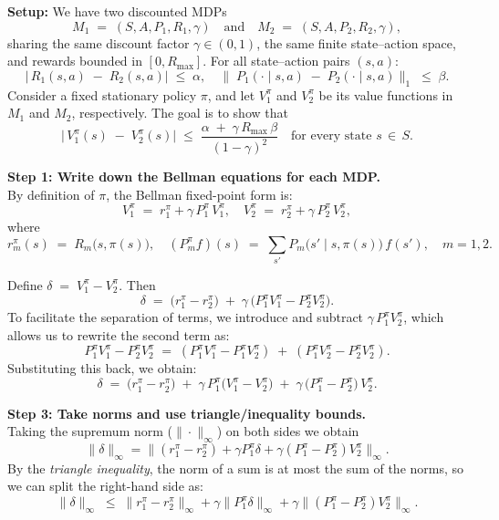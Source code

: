 \textbf{Setup:} We have two discounted MDPs 
\[
  M_1 \;=\; (S, A, P_1, R_1, \gamma)
  \quad\text{and}\quad
  M_2 \;=\; (S, A, P_2, R_2, \gamma),
\]
sharing the same discount factor $\gamma \in (0,1)$, the same finite state--action space, and rewards bounded in $[0,R_{\max}]$.  
For all state--action pairs $(s,a)$:
\[
  \bigl|\,R_1(s,a) \;-\; R_2(s,a)\bigr|\;\le\;\alpha,
  \quad
  \bigl\|\;P_1(\cdot \mid s,a)\;-\;P_2(\cdot \mid s,a)\bigr\|_{1}\;\le\;\beta.
\]
Consider a fixed stationary policy $\pi$, and let $V_{1}^{\pi}$ and $V_{2}^{\pi}$ be its value functions in $M_1$ and $M_2$, respectively. The goal is to show that
\[
  \bigl|\,V_{1}^{\pi}(s)\;-\;V_{2}^{\pi}(s)\bigr|
  \;\le\;
  \frac{\alpha \;+\;\gamma\,R_{\max}\,\beta}{(1-\gamma)^{2}}
  \quad
  \text{for every state }s\,\in\,S.
\]

\bigskip
\noindent
\textbf{Step 1: Write down the Bellman equations for each MDP.}\\
By definition of $\pi$, the Bellman fixed-point form is:
\[
  V_{1}^{\pi} \;=\; r_{1}^{\pi} + \gamma\,P_{1}^{\pi}\,V_{1}^{\pi},
  \quad
  V_{2}^{\pi} \;=\; r_{2}^{\pi} + \gamma\,P_{2}^{\pi}\,V_{2}^{\pi},
\]
where
\[
  r_{m}^{\pi}(s) \;=\; R_{m}\bigl(s,\pi(s)\bigr), 
  \quad
  (P_{m}^{\pi} f)(s) \;=\;
   \sum_{s'}P_{m}\bigl(s'\mid s,\pi(s)\bigr)\,f(s'),
  \quad
  m = 1,2.
\]

Define $\delta \;=\; V_{1}^{\pi}-V_{2}^{\pi}$. Then
\[
  \delta
  \;=\;
  \bigl(r_{1}^{\pi} - r_{2}^{\pi}\bigr)
  \;+\;
  \gamma\,\bigl(P_{1}^{\pi}V_{1}^{\pi} - P_{2}^{\pi}V_{2}^{\pi}\bigr).
\]
To facilitate the separation of terms, we introduce and subtract $\gamma\,P_{1}^{\pi}V_{2}^{\pi}$, which allows us to rewrite the second term as:
\[
  P_{1}^{\pi}V_{1}^{\pi} - P_{2}^{\pi}V_{2}^{\pi}
  \;=\;
  (P_{1}^{\pi}V_{1}^{\pi} - P_{1}^{\pi}V_{2}^{\pi})
  \;+\;
  (P_{1}^{\pi}V_{2}^{\pi} - P_{2}^{\pi}V_{2}^{\pi}).
\]
Substituting this back, we obtain:
\[
  \delta
  \;=\;
  \bigl(r_{1}^{\pi} - r_{2}^{\pi}\bigr)
  \;+\;
  \gamma\,P_{1}^{\pi}\bigl(V_{1}^{\pi}-V_{2}^{\pi}\bigr)
  \;+\;
  \gamma\,\bigl(P_{1}^{\pi}-P_{2}^{\pi}\bigr)\,V_{2}^{\pi}.
\]


\bigskip
\noindent
\textbf{Step 3: Take norms and use triangle/inequality bounds.}\\
Taking the supremum norm ($\|\cdot\|_{\infty}$) on both sides we obtain
\[
\|\delta\|_{\infty} = \bigl\| (r_1^\pi - r_2^\pi) + \gamma P_1^\pi \delta + \gamma (P_1^\pi - P_2^\pi) V_2^\pi \bigr\|_{\infty}.
\]
By the \textit{triangle inequality}, the norm of a sum is at most the sum of the norms, so we can split the right-hand side as:
\[
\|\delta\|_{\infty} 
\;\le\;
\| r_1^\pi - r_2^\pi \|_{\infty} 
+ \gamma \| P_1^\pi \delta \|_{\infty} 
+ \gamma \| (P_1^\pi - P_2^\pi) V_2^\pi \|_{\infty}.
\]

